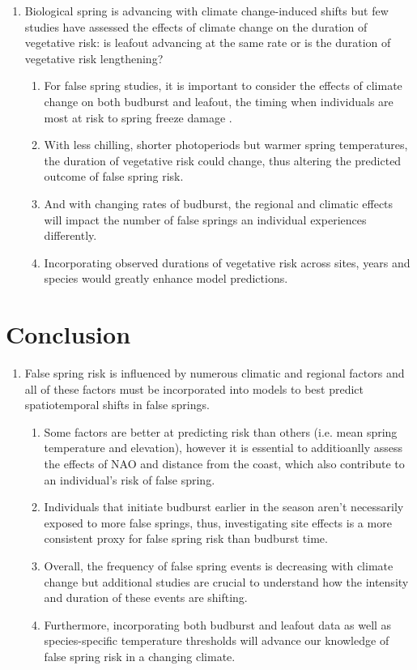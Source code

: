 \documentclass{article}\usepackage[]{graphicx}\usepackage[]{color}
\begin{document}
\begin{enumerate}
\item Biological spring is advancing with climate change-induced shifts but few studies have assessed the effects of climate change on the duration of vegetative risk: is leafout advancing at the same rate or is the duration of vegetative risk lengthening?
  \begin{enumerate}
  \item For false spring studies, it is important to consider the effects of climate change on both budburst and leafout, the timing when individuals are most at risk to spring freeze damage \citep{Lenz2016}.
  \item With less chilling, shorter photoperiods but warmer spring temperatures, the duration of vegetative risk could change, thus altering the predicted outcome of false spring risk.
  \item And with changing rates of budburst, the regional and climatic effects will impact the number of false springs an individual experiences differently.
  \item Incorporating observed durations of vegetative risk across sites, years and species would greatly enhance model predictions. 
  \end{enumerate}
\end{enumerate}
  
\section*{Conclusion}
\begin{enumerate}
\item False spring risk is influenced by numerous climatic and regional factors and all of these factors must be incorporated into models to best predict spatiotemporal shifts in false springs.
  \begin{enumerate}
  \item Some factors are better at predicting risk than others (i.e. mean spring temperature and elevation), however it is essential to additioanlly assess the effects of NAO and distance from the coast, which also contribute to an individual's risk of false spring. 
  \item Individuals that initiate budburst earlier in the season aren't necessarily exposed to more false springs, thus, investigating site effects is a more consistent proxy for false spring risk than budburst time. 
  \item Overall, the frequency of false spring events is decreasing with climate change but additional studies are crucial to understand how the intensity and duration of these events are shifting.
  \item Furthermore, incorporating both budburst and leafout data as well as species-specific temperature thresholds will advance our knowledge of false spring risk in a changing climate. 
  \end{enumerate}
\end{enumerate}
  
\end{document}

